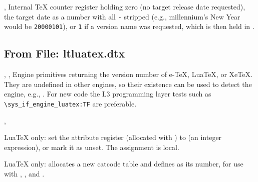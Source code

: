 \documentclass{l3in2edoc}
\begin{document}
\begin{variable}[int]
  {
    \pkgcls@targetdate,
    \pkgcls@targetlabel
  }
  Internal \TeX{} counter register holding zero (no target release
  date requested), the target date as a number with all \texttt{-}
  stripped (e.g., millennium's New Year would be \texttt{20000101}),
  or \texttt{1} if a version name was requested, which is then held
  in .

\end{variable}




\subsection{From File: ltluatex.dtx}

\begin{variable}[]
  {
    \eTeXversion,
    \luatexversion,
    \XeTeXversion
  }
  Engine primitives returning the version number of e-\TeX{},
  Lua\TeX{}, or Xe\TeX{}. They are undefined in other engines, so
  their existence can be used to detect the engine, e.g.,
  . For new code the L3 programming
  layer tests such as \texttt{\textbackslash sys\_if\_engine\_luatex:TF}
  are preferable.
\end{variable}





\begin{function}[]
  {
    \setattribute,
    \unsetattribute
  }
  \begin{syntax}
      
     
  \end{syntax}
  Lua\TeX{} only: set the attribute register 
  (allocated with ) to  (an integer
  expression), or mark it as unset. The assignment is local.
\end{function}




\begin{function}[]
  {
    \newcatcodetable
  }
  \begin{syntax}
     
  \end{syntax}
  Lua\TeX{} only: allocates a new catcode table and defines
   as its number, for use with ,
  , and .
\end{function}
\end{document}

